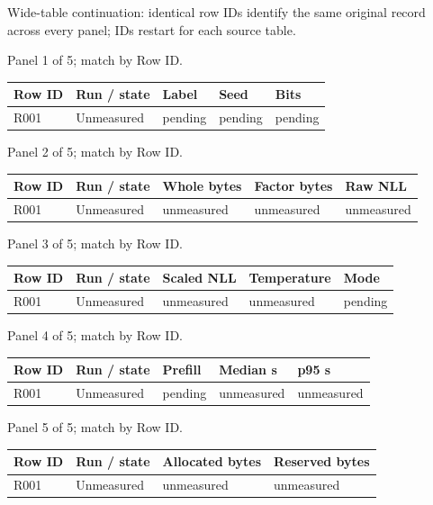 \documentclass[10pt]{article}
\begin{document}
Wide-table continuation: identical row IDs identify the same original record across every panel; IDs restart for each source table.
\par\noindent Panel 1 of 5; match by Row ID.
{\scriptsize\setlength{\tabcolsep}{2pt}
\begin{longtable}{p{}p{}p{}p{}p{}}
Row ID & Run / state & Label & Seed & Bits \\
\hline\endhead
R001 & Unmeasured & pending & pending & pending \\
\end{longtable}}
\par\noindent Panel 2 of 5; match by Row ID.
{\scriptsize\setlength{\tabcolsep}{2pt}
\begin{longtable}{p{}p{}p{}p{}p{}}
Row ID & Run / state & Whole bytes & Factor bytes & Raw NLL \\
\hline\endhead
R001 & Unmeasured & unmeasured & unmeasured & unmeasured \\
\end{longtable}}
\par\noindent Panel 3 of 5; match by Row ID.
{\scriptsize\setlength{\tabcolsep}{2pt}
\begin{longtable}{p{}p{}p{}p{}p{}}
Row ID & Run / state & Scaled NLL & Temperature & Mode \\
\hline\endhead
R001 & Unmeasured & unmeasured & unmeasured & pending \\
\end{longtable}}
\par\noindent Panel 4 of 5; match by Row ID.
{\scriptsize\setlength{\tabcolsep}{2pt}
\begin{longtable}{p{}p{}p{}p{}p{}}
Row ID & Run / state & Prefill & Median s & p95 s \\
\hline\endhead
R001 & Unmeasured & pending & unmeasured & unmeasured \\
\end{longtable}}
\par\noindent Panel 5 of 5; match by Row ID.
{\scriptsize\setlength{\tabcolsep}{2pt}
\begin{longtable}{p{}p{}p{}p{}}
Row ID & Run / state & Allocated bytes & Reserved bytes \\
\hline\endhead
R001 & Unmeasured & unmeasured & unmeasured \\
\end{longtable}}
\end{document}
